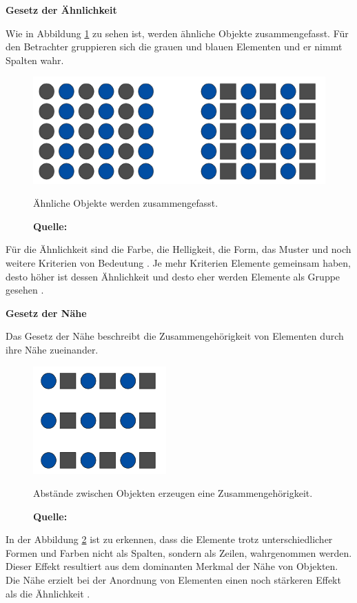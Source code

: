 \textbf{Gesetz der Ähnlichkeit}

Wie in Abbildung \ref{fig:aehnlichkeit} zu sehen ist, werden ähnliche Objekte zusammengefasst. Für den Betrachter gruppieren sich die grauen und blauen Elementen und er nimmt Spalten wahr.
\begin{figure}[H]
  \centering
  \includegraphics[scale=1]{img/gesetz_der_Aehnlichkeit.PNG}
  \caption{Ähnliche Objekte werden zusammengefasst.}
    \caption*{\textbf{Quelle:} \citep{Dahm2006}}
  \label{fig:aehnlichkeit}
\end{figure}
Für die Ähnlichkeit sind die Farbe, die Helligkeit, die Form, das Muster und noch weitere Kriterien von Bedeutung \citep[vgl.][59f]{Dahm2006}. Je mehr Kriterien Elemente gemeinsam haben, desto höher ist dessen Ähnlichkeit und desto eher werden Elemente als Gruppe gesehen \citep[vgl.][]{HTMLSeminarDe}.

\textbf{Gesetz der Nähe}

Das Gesetz der Nähe beschreibt die Zusammengehörigkeit von Elementen durch ihre Nähe zueinander.
\begin{figure}[H]
  \centering
  \includegraphics[scale=1]{img/gesetz_der_Naehe.PNG}
  \caption{Abstände zwischen Objekten erzeugen eine Zusammengehörigkeit.}
    \caption*{\textbf{Quelle:} \citep{Dahm2006}}
  \label{fig:naehe}
\end{figure}
In der Abbildung \ref{fig:naehe} ist zu erkennen, dass die Elemente trotz unterschiedlicher Formen und Farben  nicht als Spalten, sondern als Zeilen, wahrgenommen werden. Dieser Effekt resultiert aus dem dominanten Merkmal der Nähe von Objekten. Die Nähe erzielt bei der Anordnung von Elementen einen noch stärkeren Effekt als die Ähnlichkeit \citep[vgl.][60]{Dahm2006}.

